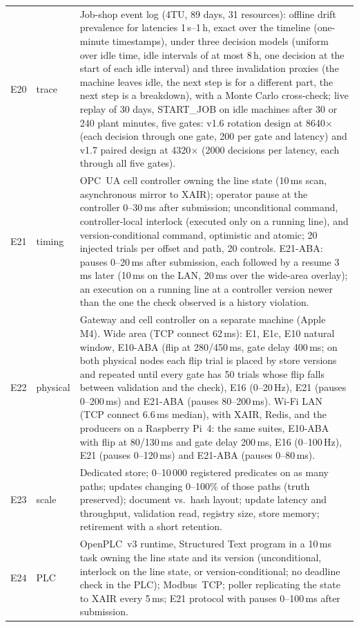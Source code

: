 \documentclass[11pt]{article}
\begin{document}
{\begin{longtable}{@{}P{1.85cm}P{1.30cm}P{\dimexpr\linewidth-3.15cm-4\tabcolsep\relax}@{}}
E20 & trace & Job-shop event log (4TU, 89 days, 31 resources): offline drift prevalence for latencies 1\,s--1\,h, exact over the timeline (one-minute timestamps), under three decision models (uniform over idle time, idle intervals of at most 8\,h, one decision at the start of each idle interval) and three invalidation proxies (the machine leaves idle, the next step is for a different part, the next step is a breakdown), with a Monte Carlo cross-check; live replay of 30 days, START\_JOB on idle machines after 30 or 240 plant minutes, five gates: v1.6 rotation design at 8640$\times$ (each decision through one gate, 200 per gate and latency) and v1.7 paired design at 4320$\times$ (2000 decisions per latency, each through all five gates). \\
E21 & timing & OPC~UA cell controller owning the line state (10\,ms scan, asynchronous mirror to XAIR); operator pause at the controller 0--30\,ms after submission; unconditional command, controller-local interlock (executed only on a running line), and version-conditional command, optimistic and atomic; 20 injected trials per offset and path, 20 controls. E21-ABA: pauses 0--20\,ms after submission, each followed by a resume 3\,ms later (10\,ms on the LAN, 20\,ms over the wide-area overlay); an execution on a running line at a controller version newer than the one the check observed is a history violation. \\
E22 & physical & Gateway and cell controller on a separate machine (Apple M4). Wide area (TCP connect 62\,ms): E1, E1c, E10 natural window, E10-ABA (flip at 280/450\,ms, gate delay 400\,ms; on both physical nodes each flip trial is placed by store versions and repeated until every gate has 50 trials whose flip falls between validation and the check), E16 (0--20\,Hz), E21 (pauses 0--200\,ms) and E21-ABA (pauses 80--200\,ms). Wi-Fi LAN (TCP connect 6.6\,ms median), with XAIR, Redis, and the producers on a Raspberry Pi~4: the same suites, E10-ABA with flip at 80/130\,ms and gate delay 200\,ms, E16 (0--100\,Hz), E21 (pauses 0--120\,ms) and E21-ABA (pauses 0--80\,ms). \\
E23 & scale & Dedicated store; 0--10\,000 registered predicates on as many paths; updates changing 0--100\% of those paths (truth preserved); document vs.\ hash layout; update latency and throughput, validation read, registry size, store memory; retirement with a short retention. \\
E24 & PLC & OpenPLC~v3 runtime, Structured Text program in a 10\,ms task owning the line state and its version (unconditional, interlock on the line state, or version-conditional; no deadline check in the PLC); Modbus~TCP; poller replicating the state to XAIR every 5\,ms; E21 protocol with pauses 0--100\,ms after submission. \\

\end{longtable}}
\end{document}
